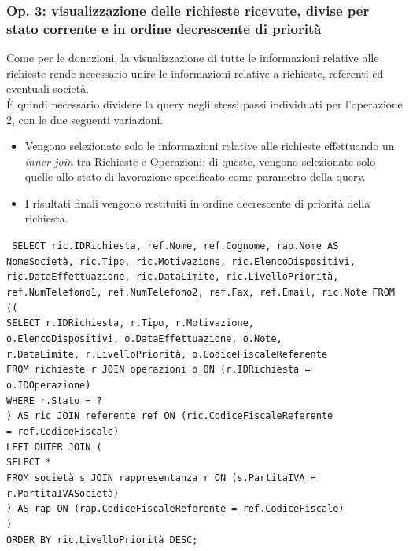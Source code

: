 \documentclass[a4paper,12pt]{report}
\begin{document}
\subsubsection{Op. 3: visualizzazione delle richieste ricevute, divise per stato corrente e in ordine decrescente di priorità}

Come per le donazioni, la visualizzazione di tutte le informazioni relative alle richieste rende necessario unire le informazioni relative a richieste, referenti ed eventuali società. \\
È quindi necessario dividere la query negli stessi passi individuati per l'operazione 2, con le due seguenti variazioni.
\begin{itemize}
    \item Vengono selezionate solo le informazioni relative alle richieste effettuando un \textit{inner join} tra Richieste e Operazioni; di queste, vengono selezionate solo quelle allo stato di lavorazione specificato come parametro della query.
    \item I risultati finali vengono restituiti in ordine decrescente di priorità della richiesta.
\end{itemize}

\noindent \texttt{
SELECT ric.IDRichiesta, ref.Nome, ref.Cognome, rap.Nome AS NomeSocietà, ric.Tipo, ric.Motivazione, ric.ElencoDispositivi, ric.DataEffettuazione, ric.DataLimite, ric.LivelloPriorità, ref.NumTelefono1, ref.NumTelefono2, ref.Fax, ref.Email, ric.Note 
FROM (( \\
        \indent \indent  SELECT r.IDRichiesta, r.Tipo, r.Motivazione, \\ 
        \indent \indent o.ElencoDispositivi,
        o.DataEffettuazione, o.Note, \\
        \indent \indent r.DataLimite, r.LivelloPriorità, o.CodiceFiscaleReferente \\
        \indent \indent  FROM richieste r JOIN operazioni o ON (r.IDRichiesta = \\ 
        \indent \indent o.IDOperazione) \\
        \indent \indent  WHERE r.Stato = ? \\
    \indent ) AS ric JOIN referente ref ON (ric.CodiceFiscaleReferente \\
    \indent = ref.CodiceFiscale) \\
    \indent LEFT OUTER JOIN ( \\
        \indent \indent SELECT * \\
        \indent \indent FROM società s JOIN rappresentanza r ON (s.PartitaIVA = \\ 
        \indent \indent r.PartitaIVASocietà) \\
    \indent ) AS rap ON (rap.CodiceFiscaleReferente = ref.CodiceFiscale) \\
) \\
ORDER BY ric.LivelloPriorità DESC;
} \\
\end{document}
